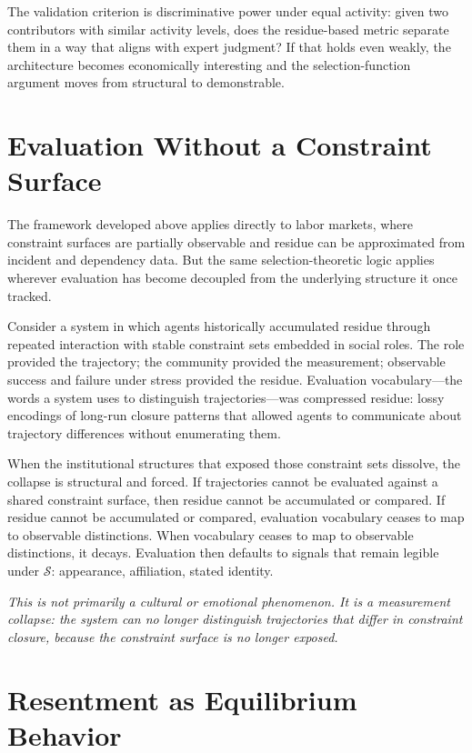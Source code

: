 \documentclass[12pt]{article}
\begin{document}
The validation criterion is discriminative power under equal activity:
given two contributors with similar activity levels, does the
residue-based metric separate them in a way that aligns with expert
judgment? If that holds even weakly, the architecture becomes
economically interesting and the selection-function argument moves from
structural to demonstrable.

\section{Evaluation Without a Constraint Surface}

The framework developed above applies directly to labor markets, where
constraint surfaces are partially observable and residue can be
approximated from incident and dependency data. But the same
selection-theoretic logic applies wherever evaluation has become
decoupled from the underlying structure it once tracked.

Consider a system in which agents historically accumulated residue
through repeated interaction with stable constraint sets embedded in
social roles. The role provided the trajectory; the community provided
the measurement; observable success and failure under stress provided
the residue. Evaluation vocabulary---the words a system uses to
distinguish trajectories---was compressed residue: lossy encodings of
long-run closure patterns that allowed agents to communicate about
trajectory differences without enumerating them.

When the institutional structures that exposed those constraint sets
dissolve, the collapse is structural and forced. If trajectories cannot
be evaluated against a shared constraint surface, then residue cannot be
accumulated or compared. If residue cannot be accumulated or compared,
evaluation vocabulary ceases to map to observable distinctions. When
vocabulary ceases to map to observable distinctions, it decays.
Evaluation then defaults to signals that remain legible under
$\mathcal{S}$: appearance, affiliation, stated identity.

\medskip
\noindent\textit{This is not primarily a cultural or emotional
phenomenon. It is a measurement collapse: the system can no longer
distinguish trajectories that differ in constraint closure, because the
constraint surface is no longer exposed.}
\medskip

\section{Resentment as Equilibrium Behavior}
\end{document}
